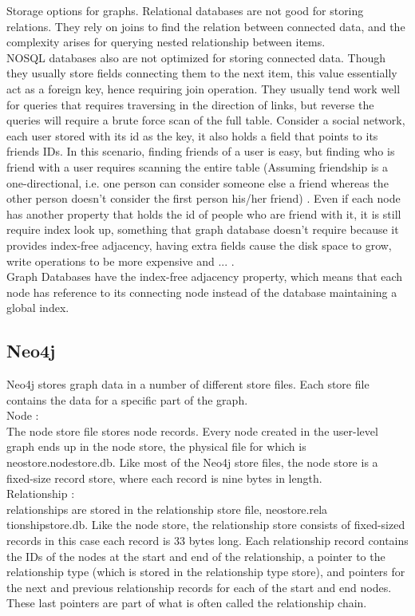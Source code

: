 \documentclass[english]{tktltiki}
\begin{document}
Storage options for graphs.
Relational databases are not good for storing relations. They rely on joins to find the relation between connected data, and the complexity arises for 
querying nested relationship between items. \\
NOSQL databases also are not optimized for storing connected data. Though they usually store fields connecting them to the next item, this value essentially act as a foreign key, hence requiring join operation. They usually tend work well for queries that requires traversing in the direction of links, but reverse the queries will require a brute force scan of the full table. Consider a social network, each user stored with its id as the key, it also holds a field that points to its friends IDs. In this scenario, finding friends of a user is easy, but finding who is friend with a user requires scanning the entire table (Assuming friendship is a one-directional, i.e. one person can consider someone else a friend whereas the other person doesn't consider the first person his/her friend) . Even if each node has another property that holds the id of people who are friend with it, it is still require index look up, something that graph database doesn't require because it provides index-free adjacency, having extra fields cause the disk space to grow, write operations to be more expensive and ... .\\
Graph Databases have the index-free adjacency property, which means that each node has reference to its connecting node instead of the database maintaining a global index.

\subsection{Neo4j }
Neo4j stores graph data in a number of different store files. Each store file contains the data for a specific part of the graph.\\
Node :\\
The node store file stores node records. Every node created in the user-level graph ends up in the node store, the physical file for which is neostore.nodestore.db. Like most of the Neo4j store files, the node store is a fixed-size record store, where each record is nine bytes in length. \\
Relationship :\\
relationships are stored in the relationship store file, neostore.rela tionshipstore.db. Like the node store, the relationship store consists of fixed-sized records in this case each record is 33 bytes long. Each relationship record contains the IDs of the nodes at the start and end of the relationship, a pointer to the relationship type (which is stored in the relationship type store), and pointers for the next and previous relationship records for each of the start and end nodes. These last pointers are part of what is often called the relationship chain.
\end{document}
